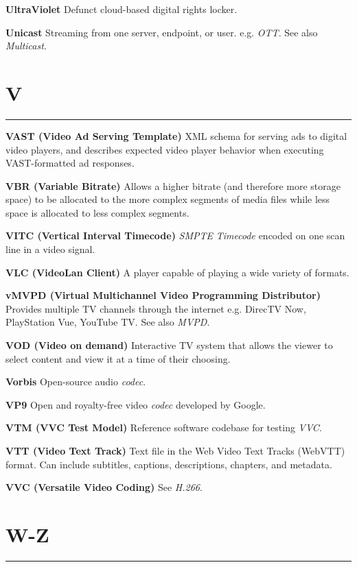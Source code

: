 \smallskip
\textbf{UltraViolet}
Defunct cloud-based digital rights locker.

\smallskip
\textbf{Unicast}
Streaming from one server, endpoint, or user. e.g. \textit{OTT}.  See also \textit{Multicast}.


\section{V}
\hrule

\medskip
\textbf{VAST (Video Ad Serving Template)}
XML schema for serving ads to digital video players, and describes expected video player behavior when executing VAST-formatted ad responses.

\smallskip
\textbf{VBR (Variable Bitrate)}
Allows a higher bitrate (and therefore more storage space) to be allocated to the more complex segments of media files while less space is allocated to less complex segments.

\smallskip
\textbf{VITC (Vertical Interval Timecode)}
\textit{SMPTE} \textit{Timecode} encoded on one scan line in a video signal.

\smallskip
\textbf{VLC (VideoLan Client)}
A player capable of playing a wide variety of formats.

\smallskip
\textbf{vMVPD (Virtual Multichannel Video Programming Distributor)}
Provides multiple TV channels through the internet e.g. DirecTV Now, PlayStation Vue, YouTube TV. See also \textit{MVPD}.

\smallskip
\textbf{VOD (Video on demand)}
Interactive TV system that allows the viewer to select content and view it at a time of their choosing.

\smallskip
\textbf{Vorbis}
Open-source audio \textit{codec}.

\smallskip
\textbf{VP9}
Open and royalty-free video \textit{codec} developed by Google.

\smallskip
\textbf{VTM (VVC Test Model)}
Reference software codebase for testing \textit{VVC}.

\smallskip
\textbf{VTT (Video Text Track)}
Text file in the Web Video Text Tracks (WebVTT) format. Can include subtitles, captions, descriptions, chapters, and metadata.

\smallskip
\textbf{VVC (Versatile Video Coding)}
See \textit{H.266}.


\section{W-Z}
\hrule

